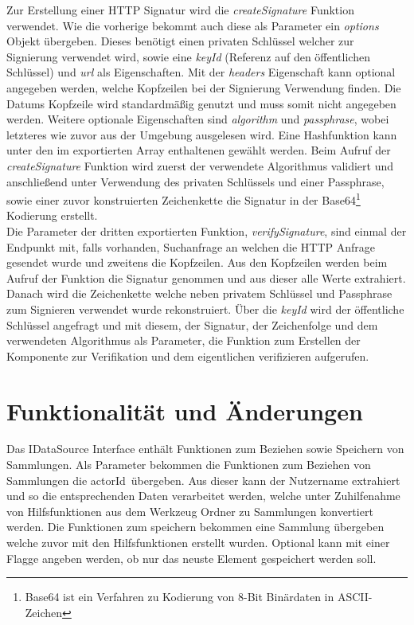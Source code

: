 Zur Erstellung einer HTTP Signatur wird die \textit{createSignature} Funktion verwendet. Wie die vorherige bekommt auch diese als Parameter ein \textit{options} Objekt übergeben. Dieses benötigt einen privaten Schlüssel welcher zur Signierung verwendet wird, sowie eine \textit{keyId} (Referenz auf den öffentlichen Schlüssel) und \textit{url} als Eigenschaften. Mit der \textit{headers} Eigenschaft kann optional angegeben werden, welche Kopfzeilen bei der Signierung Verwendung finden. Die Datums Kopfzeile wird standardmäßig genutzt und muss somit nicht angegeben werden. Weitere optionale Eigenschaften sind \textit{algorithm} und \textit{passphrase}, wobei letzteres wie zuvor aus der Umgebung ausgelesen wird. Eine Hashfunktion kann unter den im exportierten Array enthaltenen gewählt werden. Beim Aufruf der \textit{createSignature} Funktion wird zuerst der verwendete Algorithmus validiert und anschließend unter Verwendung des privaten Schlüssels und einer Passphrase, sowie einer zuvor konstruierten Zeichenkette die Signatur in der Base64\footnote{Base64 ist ein Verfahren zu Kodierung von 8-Bit Binärdaten in ASCII-Zeichen} Kodierung erstellt.\\

Die Parameter der dritten exportierten Funktion, \textit{verifySignature}, sind einmal der Endpunkt mit, falls vorhanden, Suchanfrage an welchen die HTTP Anfrage gesendet wurde und zweitens die Kopfzeilen. Aus den Kopfzeilen werden beim Aufruf der Funktion die Signatur genommen und aus dieser alle Werte extrahiert. Danach wird die Zeichenkette welche neben privatem Schlüssel und Passphrase zum Signieren verwendet wurde rekonstruiert. Über die \textit{keyId} wird der öffentliche Schlüssel angefragt und mit diesem, der Signatur, der Zeichenfolge und dem verwendeten Algorithmus als Parameter, die Funktion zum Erstellen der Komponente zur Verifikation und dem eigentlichen verifizieren aufgerufen.\\

\section{Funktionalität und Änderungen}
Das IDataSource Interface enthält Funktionen zum Beziehen sowie Speichern von Sammlungen. Als Parameter bekommen die Funktionen zum Beziehen von Sammlungen die \glqq actorId\grqq~übergeben. Aus dieser kann der Nutzername extrahiert und so die entsprechenden Daten verarbeitet werden, welche unter Zuhilfenahme von Hilfsfunktionen aus dem Werkzeug Ordner zu Sammlungen konvertiert werden. Die Funktionen zum speichern bekommen eine Sammlung übergeben welche zuvor mit den Hilfsfunktionen erstellt wurden. Optional kann mit einer Flagge angeben werden, ob nur das neuste Element gespeichert werden soll.\\

